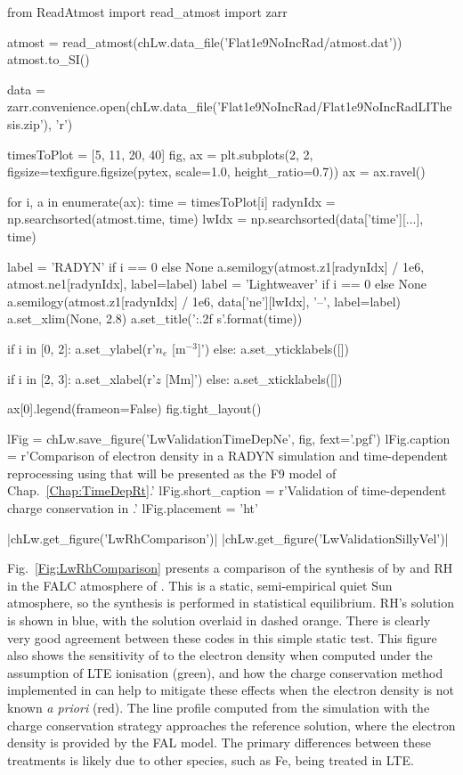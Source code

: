 \begin{pycode}[Lw]
from ReadAtmost import read_atmost
import zarr

atmost = read_atmost(chLw.data_file('Flat1e9NoIncRad/atmost.dat'))
atmost.to_SI()

data = zarr.convenience.open(chLw.data_file('Flat1e9NoIncRad/Flat1e9NoIncRadLIThesis.zip'), 'r')

timesToPlot = [5, 11, 20, 40]
fig, ax = plt.subplots(2, 2, figsize=texfigure.figsize(pytex, scale=1.0, height_ratio=0.7))
ax = ax.ravel()

for i, a in enumerate(ax):
    time = timesToPlot[i]
    radynIdx = np.searchsorted(atmost.time, time)
    lwIdx = np.searchsorted(data['time'][...], time)

    label = 'RADYN' if i == 0 else None
    a.semilogy(atmost.z1[radynIdx] / 1e6, atmost.ne1[radynIdx], label=label)
    label = 'Lightweaver' if i == 0 else None
    a.semilogy(atmost.z1[radynIdx] / 1e6, data['ne'][lwIdx], '--', label=label)
    a.set_xlim(None, 2.8)
    a.set_title('{:.2f} s'.format(time))

    if i in [0, 2]:
        a.set_ylabel(r'$n_e$ [m$^{-3}$]')
    else:
        a.set_yticklabels([])

    if i in [2, 3]:
        a.set_xlabel(r'$z$ [Mm]')
    else:
        a.set_xticklabels([])

ax[0].legend(frameon=False)
fig.tight_layout()

lFig = chLw.save_figure('LwValidationTimeDepNe', fig, fext='.pgf')
lFig.caption = r'Comparison of electron density in a RADYN simulation and time-dependent reprocessing using \Lw{} that will be presented as the F9 model of Chap.~\ref{Chap:TimeDepRt}.'
lFig.short_caption = r'Validation of time-dependent charge conservation in \Lw{}.'
lFig.placement = 'ht'
\end{pycode}

\py[Lw]|chLw.get_figure('LwRhComparison')|
\py[Lw]|chLw.get_figure('LwValidationSillyVel')|


Fig.~\ref{Fig:LwRhComparison} presents a comparison of the synthesis of \CaLine{} by \Lw{} and RH in the FALC atmosphere of \citet{Fontenla1993}.
This is a static, semi-empirical quiet Sun atmosphere, so the synthesis is performed in statistical equilibrium.
RH's solution is shown in blue, with the \Lw{} solution overlaid in dashed orange.
There is clearly very good agreement between these codes in this simple static test.
This figure also shows the sensitivity of \CaLine{} to the electron density when computed under the assumption of LTE ionisation (green), and how the charge conservation method implemented in \Lw{} can help to mitigate these effects when the electron density is not known \emph{a priori} (red).
The line profile computed from the simulation with the charge conservation strategy approaches the reference solution, where the electron density is provided by the FAL model.
The primary differences between these treatments is likely due to other species, such as Fe, being treated in LTE.

